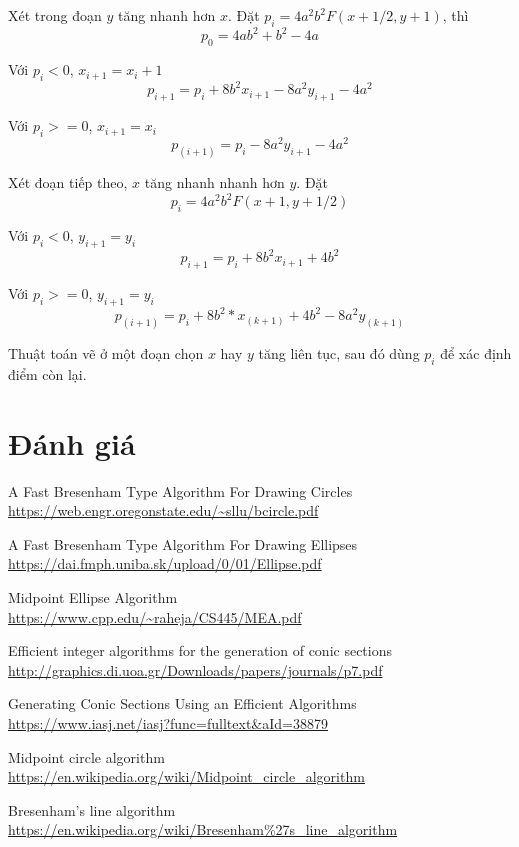 \documentclass[12pt]{article}
\begin{document}
Xét trong đoạn \(y\) tăng nhanh hơn \(x\).
Đặt \(p_i = 4a^2 b^2 F(x + 1/2, y + 1)\), thì
\[p_0 = 4ab^2 + b^2 - 4a\]

Với \(p_i < 0\), \(x_{i+1} = x_i + 1\)
\[p_{i+1} = p_i + 8b^2 x_{i+1} - 8a^2 y_{i+1} - 4a^2\]

Với \(p_i >= 0\), \(x_{i+1} = x_i\)
\[p_(i+1) = p_i - 8a^2 y_{i+1} - 4a^2\]

Xét đoạn tiếp theo, \(x\) tăng nhanh nhanh hơn \(y\).
Đặt \[p_i = 4a^2 b^2 F(x + 1, y + 1/2)\]

Với \(p_i < 0\), \(y_{i+1} = y_i\)
\[p_{i+1} = p_i + 8b^2 x_{i+1} + 4b^2\]

Với \(p_i >= 0\), \(y_{i+1} = y_i\)
\[p_(i+1) = p_i + 8b^2 * x_(k+1) + 4b^2 - 8a^2 y_(k+1)\]

Thuật toán vẽ ở một đoạn chọn \(x\) hay \(y\) tăng liên tục,
sau đó dùng \(p_i\) để xác định điểm còn lại.

\section{Đánh giá}



\begin{thebibliography}{1}
A Fast Bresenham Type Algorithm For Drawing Circles \\
\url{https://web.engr.oregonstate.edu/~sllu/bcircle.pdf}

A Fast Bresenham Type Algorithm For Drawing Ellipses \\
\url{https://dai.fmph.uniba.sk/upload/0/01/Ellipse.pdf}

Midpoint Ellipse Algorithm \\
\url{https://www.cpp.edu/~raheja/CS445/MEA.pdf}

Efficient integer algorithms for the generation of conic sections \\
\url{http://graphics.di.uoa.gr/Downloads/papers/journals/p7.pdf}

Generating Conic Sections Using an Efficient Algorithms \\
\url{https://www.iasj.net/iasj?func=fulltext&aId=38879}

Midpoint circle algorithm \\
\url{https://en.wikipedia.org/wiki/Midpoint_circle_algorithm}

Bresenham's line algorithm \\
\url{https://en.wikipedia.org/wiki/Bresenham%27s_line_algorithm}
\end{thebibliography}
\end{document}
